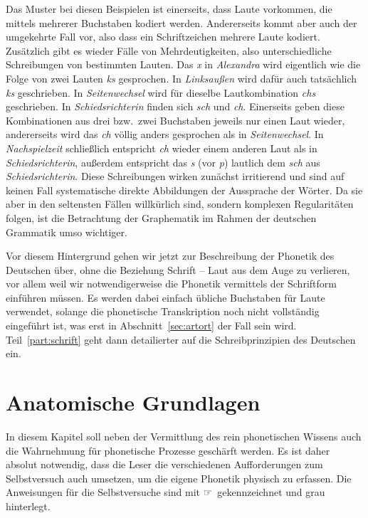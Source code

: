 Das Muster bei diesen Beispielen ist einerseits, dass Laute vorkommen, die mittels mehrerer Buchstaben kodiert werden.
Andererseits kommt aber auch der umgekehrte Fall vor, also dass ein Schriftzeichen mehrere Laute kodiert.
Zusätzlich gibt es wieder Fälle von Mehrdeutigkeiten, also unterschiedliche Schreibungen von bestimmten Lauten.
Das \textit{x} in \textit{Alexandra} wird eigentlich wie die Folge von zwei Lauten \textit{ks} gesprochen.
In \textit{Linksaußen} wird dafür auch tatsächlich \textit{ks} geschrieben.
In \textit{Seitenwechsel} wird für dieselbe Lautkombination \textit{chs} geschrieben.
In \textit{Schiedsrichterin} finden sich \textit{sch} und \textit{ch}.
Einerseits geben diese Kombinationen aus drei bzw.\ zwei Buchstaben jeweils nur einen Laut wieder, andererseits wird das \textit{ch} völlig anders gesprochen als in \textit{Seitenwechsel}.
In \textit{Nachspielzeit} schließlich entspricht \textit{ch} wieder einem anderen Laut als in \textit{Schiedsrichterin}, außerdem entspricht das \textit{s} (vor \textit{p}) lautlich dem \textit{sch} aus \textit{Schiedsrichterin}.
Diese Schreibungen wirken zunächst irritierend und sind auf keinen Fall systematische direkte Abbildungen der Aussprache der Wörter.
Da sie aber in den seltensten Fällen willkürlich sind, sondern komplexen Regularitäten folgen, ist die Betrachtung der Graphematik im Rahmen der deutschen Grammatik umso wichtiger.

Vor diesem Hintergrund gehen wir jetzt zur Beschreibung der Phonetik des Deutschen über, ohne die Beziehung Schrift -- Laut aus dem Auge zu verlieren, vor allem weil wir notwendigerweise die Phonetik vermittels der Schriftform einführen müssen.
Es werden dabei einfach übliche Buchstaben für Laute verwendet, solange die phonetische Transkription noch nicht vollständig eingeführt ist, was erst in Abschnitt~\ref{sec:artort} der Fall sein wird.
Teil~\ref{part:schrift} geht dann detailierter auf die Schreibprinzipien des Deutschen ein.

\section{Anatomische Grundlagen}

\label{sec:anatomischegrundlagen}

In diesem Kapitel soll neben der Vermittlung des rein phonetischen Wissens auch die Wahrnehmung für phonetische Prozesse geschärft werden.
Es ist daher absolut notwendig, dass die Leser die verschiedenen Aufforderungen zum Selbstversuch auch umsetzen, um die eigene Phonetik physisch zu erfassen.
Die Anweisungen für die Selbstversuche sind mit ☞\ gekennzeichnet und grau hinterlegt.

